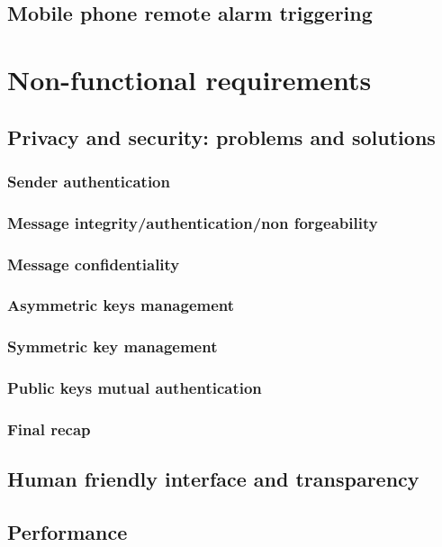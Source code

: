 \documentclass[a4paper,12pt]{article}
\begin{document}
		\subsection{Mobile phone remote alarm triggering}
	\section{Non-functional requirements}
		\subsection{Privacy and security: problems and solutions}
			\subsubsection{Sender authentication} %
			\subsubsection{Message integrity/authentication/non forgeability} %
			\subsubsection{Message confidentiality} %
			\subsubsection{Asymmetric keys management} %
			\subsubsection{Symmetric key management} %
			\subsubsection{Public keys mutual authentication} %
			\subsubsection{Final recap}
		\subsection{Human friendly interface and transparency}
		\subsection{Performance}
\end{document}
